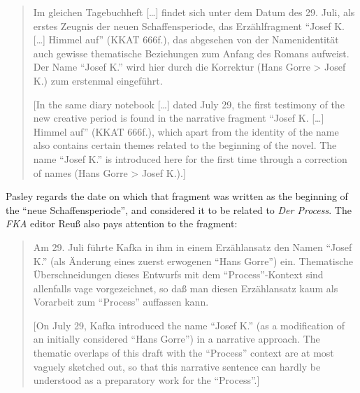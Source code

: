 \documentclass{article}
\begin{document}
\begin{quote}
Im gleichen Tagebuchheft [\ldots] findet sich unter dem Datum des 29.
Juli, als erstes Zeugnis der neuen Schaffensperiode, das Erzählfragment
``Josef K. [\ldots] Himmel auf'' (KKAT 666f.), das abgesehen von der
Namenidentität auch gewisse thematische Beziehungen zum Anfang des
Romans aufweist. Der Name ``Josef K.'' wird hier durch die Korrektur
(Hans Gorre \textgreater{} Josef K.) zum erstenmal eingeführt.

\begin{flushright}
    \parencite[73]{kafka_zur_1990}
\end{flushright}

{[}In the same diary notebook [\ldots] dated July 29, the first
testimony of the new creative period is found in the narrative fragment
``Josef K. [\ldots] Himmel auf'' (KKAT 666f.), which apart from the identity of
the name also contains certain themes related to the beginning of the
novel. The name ``Josef K.'' is introduced here for the first time
through a correction of names (Hans Gorre \textgreater{} Josef K.).{]}
\end{quote}

Pasley regards the date on which that fragment was written as the
beginning of the ``neue Schaffensperiode'', and considered it to be
related to \emph{Der Process}. The \emph{FKA} editor Reuß also pays
attention to the fragment:

\begin{quote}
Am 29. Juli führte Kafka in ihm in einem Erzählansatz den Namen ``Josef
K.'' (als Änderung eines zuerst erwogenen ``Hans Gorre'') ein.
Thematische Überschneidungen dieses Entwurfs mit dem ``Process''-Kontext
sind allenfalls vage vorgezeichnet, so daß man diesen Erzählansatz kaum
als Vorarbeit zum ``Process'' auffassen kann. 

\begin{flushright}
    \parencite[4]{kafka_zur_1997}
\end{flushright}

{[}On July 29, Kafka introduced the name ``Josef K.'' (as a modification
of an initially considered ``Hans Gorre'') in a narrative approach. The
thematic overlaps of this draft with the ``Process'' context are at most
vaguely sketched out, so that this narrative sentence can hardly be
understood as a preparatory work for the ``Process''.{]}
\end{quote}
\end{document}
